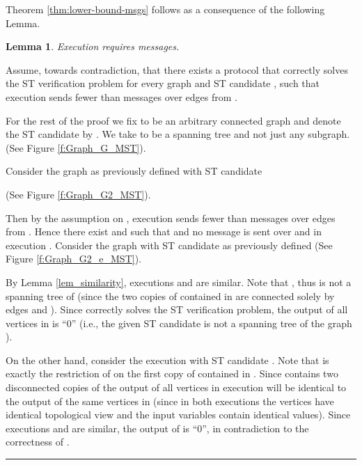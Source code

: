 \documentclass[11pt,letter]{article}
\newtheorem{lemma}[theorem]{Lemma}
\newcommand{\qed}{\rule{7pt}{7pt}}
\newenvironment{proof}{\noindent{\bf Proof}\hspace*{1em}}{\qed\bigskip}
\begin{document}
Theorem \ref{thm:lower-bound-msgs} follows as a consequence of the following 
Lemma.
\begin{lemma}
\label{clm_msg_lb}
Execution 
 requires  messages.
\end{lemma}

\begin{proof}
Assume, towards contradiction, that there exists a protocol  
that correctly solves the ST verification problem for every graph  and 
ST candidate , such that execution  sends fewer than
 messages over edges from .

For the rest of the proof we fix  to be an arbitrary connected graph 
and denote the ST candidate by .
We take  to be a spanning tree and not just any subgraph.
(See Figure \ref{f:Graph_G_MST}).
 
Consider the graph  as previously defined with ST candidate 
 
(See Figure \ref{f:Graph_G2_MST}).  

Then by the assumption on , 
execution  sends fewer than 
 messages over edges from . 
Hence there exist  and  such that 
 and no message is sent over  and  
in execution . Consider the graph  with ST candidate  
as previously defined (See Figure \ref{f:Graph_G2_e_MST}).

By Lemma \ref{lem_similarity}, executions  and  
are similar. Note that , 
thus  is not a spanning tree of  (since the two copies of    
contained in  are connected solely by edges  and ). 
Since   correctly solves the ST verification problem, the output 
of all vertices in  is ``0'' (i.e., the given ST candidate  is not 
a spanning tree of the graph ). 

On the other hand, consider the execution 
 with ST candidate . Note that  is exactly the 
restriction of  on the first copy of  contained in . 
Since  contains two disconnected copies of  the output of all vertices 
in execution  will be identical to the output of the same vertices 
in  (since in both executions the vertices have identical topological view 
and the input variables contain identical values). 
Since executions  and  are similar, the output of  is ``0'', 
in contradiction to the correctness of .
\end{proof}

\clearpage
\end{document}
